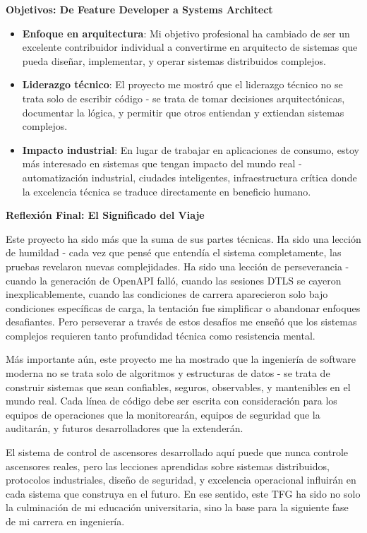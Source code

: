 \textbf{Objetivos: De Feature Developer a Systems Architect}

\begin{itemize}
    \item \textbf{Enfoque en arquitectura}: Mi objetivo profesional ha cambiado de ser un excelente contribuidor individual a convertirme en arquitecto de sistemas que pueda diseñar, implementar, y operar sistemas distribuidos complejos.
    
    \item \textbf{Liderazgo técnico}: El proyecto me mostró que el liderazgo técnico no se trata solo de escribir código - se trata de tomar decisiones arquitectónicas, documentar la lógica, y permitir que otros entiendan y extiendan sistemas complejos.
    
    \item \textbf{Impacto industrial}: En lugar de trabajar en aplicaciones de consumo, estoy más interesado en sistemas que tengan impacto del mundo real - automatización industrial, ciudades inteligentes, infraestructura crítica donde la excelencia técnica se traduce directamente en beneficio humano.
\end{itemize}

\textbf{Reflexión Final: El Significado del Viaje}

Este proyecto ha sido más que la suma de sus partes técnicas. Ha sido una lección de humildad - cada vez que pensé que entendía el sistema completamente, las pruebas revelaron nuevas complejidades. Ha sido una lección de perseverancia - cuando la generación de OpenAPI falló, cuando las sesiones DTLS se cayeron inexplicablemente, cuando las condiciones de carrera aparecieron solo bajo condiciones específicas de carga, la tentación fue simplificar o abandonar enfoques desafiantes. Pero perseverar a través de estos desafíos me enseñó que los sistemas complejos requieren tanto profundidad técnica como resistencia mental.

Más importante aún, este proyecto me ha mostrado que la ingeniería de software moderna no se trata solo de algoritmos y estructuras de datos - se trata de construir sistemas que sean confiables, seguros, observables, y mantenibles en el mundo real. Cada línea de código debe ser escrita con consideración para los equipos de operaciones que la monitorearán, equipos de seguridad que la auditarán, y futuros desarrolladores que la extenderán.

El sistema de control de ascensores desarrollado aquí puede que nunca controle ascensores reales, pero las lecciones aprendidas sobre sistemas distribuidos, protocolos industriales, diseño de seguridad, y excelencia operacional influirán en cada sistema que construya en el futuro. En ese sentido, este TFG ha sido no solo la culminación de mi educación universitaria, sino la base para la siguiente fase de mi carrera en ingeniería.


